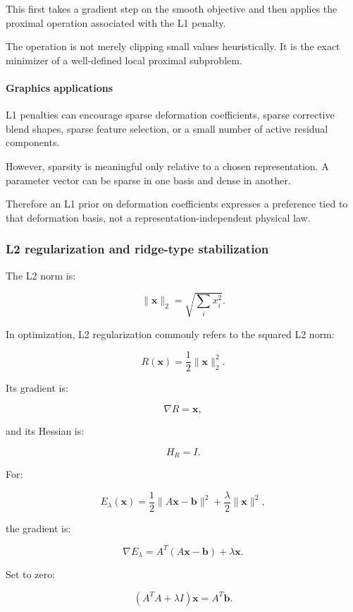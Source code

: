 This first takes a gradient step on the smooth objective and then applies the proximal operation associated with the L1 penalty.

The operation is not merely clipping small values heuristically. It is the exact minimizer of a well-defined local proximal subproblem.

\paragraph{Graphics applications}\label{02-foundations-ii-ch027-graphics-applications}

L1 penalties can encourage sparse deformation coefficients, sparse corrective blend shapes, sparse feature selection, or a small number of active residual components.

However, sparsity is meaningful only relative to a chosen representation. A parameter vector can be sparse in one basis and dense in another.

Therefore an L1 prior on deformation coefficients expresses a preference tied to that deformation basis, not a representation-independent physical law.

\subsubsection{L2 regularization and ridge-type stabilization}\label{02-foundations-ii-ch027-l2-regularization-and-ridge-type-stabilization}

The L2 norm is:

\[
\|\mathbf x\|_2= \sqrt{\sum_i x_i^2}.
\]

In optimization, L2 regularization commonly refers to the squared L2 norm:

\[
\boxed{ R(\mathbf x)=\frac12\|\mathbf x\|_2^2 }.
\]

Its gradient is:

\[
\nabla R=\mathbf x,
\]

and its Hessian is:

\[
H_R=I.
\]

For:

\[
E_\lambda(\mathbf x) = \frac12\|A\mathbf x-\mathbf b\|^2 +\frac\lambda2\|\mathbf x\|^2,
\]

the gradient is:

\[
\nabla E_\lambda = A^T(A\mathbf x-\mathbf b)+\lambda\mathbf x.
\]

Set to zero:

\[
\boxed{ (A^TA+\lambda I)\mathbf x=A^T\mathbf b }.
\]

